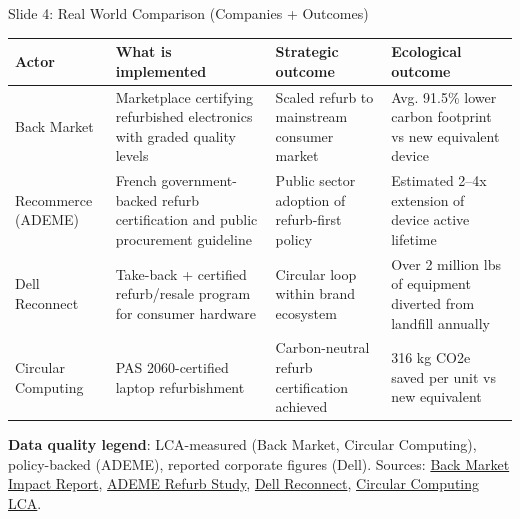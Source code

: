 \documentclass[aspectratio=169]{beamer}
\begin{document}

\begin{frame}{Slide 4: Real World Comparison (Companies + Outcomes)}
\scriptsize
\begin{tabular}{p{2.1cm}p{2.8cm}p{2.4cm}p{3.3cm}}
\toprule
Actor & What is implemented & Strategic outcome & Ecological outcome \\
\midrule
Back Market & Marketplace certifying refurbished electronics with graded quality levels & Scaled refurb to mainstream consumer market & Avg. 91.5\% lower carbon footprint vs new equivalent device \\
Recommerce (ADEME) & French government-backed refurb certification and public procurement guideline & Public sector adoption of refurb-first policy & Estimated 2--4x extension of device active lifetime \\
Dell Reconnect & Take-back + certified refurb/resale program for consumer hardware & Circular loop within brand ecosystem & Over 2 million lbs of equipment diverted from landfill annually \\
Circular Computing & PAS 2060-certified laptop refurbishment & Carbon-neutral refurb certification achieved & 316 kg CO2e saved per unit vs new equivalent \\
\bottomrule
\end{tabular}

\vspace{0.15cm}
\textbf{Data quality legend}: LCA-measured (Back Market, Circular Computing), policy-backed (ADEME), reported corporate figures (Dell).
\vspace{0.08cm}
\tiny Sources: \href{https://assets.ctfassets.net/mmeshd7gafk1/5A4644sbPjCAjENnnu91Vy/deda4195892315a31307337ce1932ca1/BM-IMPACTREPORT-USA.pdf}{Back Market Impact Report}, \href{https://librairie.ademe.fr/economie-circulaire-et-dechets/5833-assessment-of-the-environmental-impact-of-a-set-of-refurbished-products.html}{ADEME Refurb Study}, \href{https://www.dell.com/en-us/dfh/lp/outlet-why-refurbished}{Dell Reconnect}, \href{https://circularcomputing.com/news/carbon-footprint-laptop/}{Circular Computing LCA}.
\end{frame}

\end{document}
